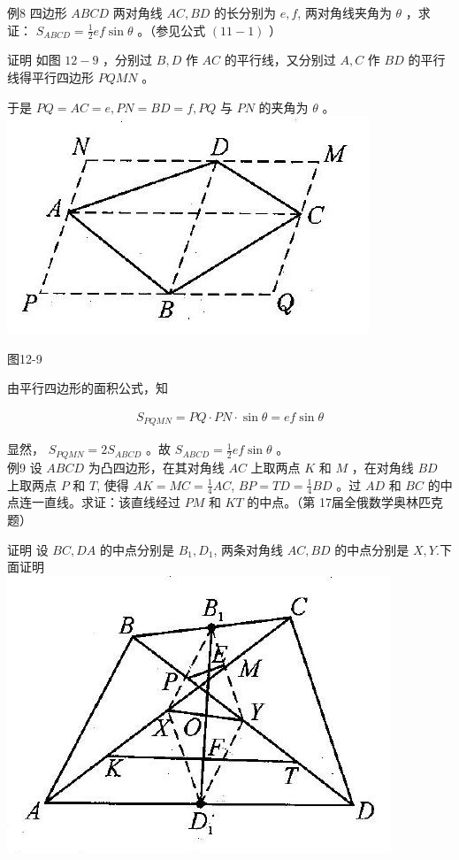 \documentclass[10pt]{article}
\begin{document}
例8 四边形 $A B C D$ 两对角线 $A C, B D$ 的长分别为 $e, f$, 两对角线夹角为 $\theta$ ，求证： $S_{A B C D}=\frac{1}{2} e f \sin \theta$ 。（参见公式 $(11-1)$ ）

证明 如图 $12-9$ ，分别过 $B, D$ 作 $A C$ 的平行线，又分别过 $A, C$ 作 $B D$ 的平行线得平行四边形 $P Q M N$ 。

于是 $P Q=A C=e, P N=B D=f, P Q$ 与 $P N$ 的夹角为 $\theta$ 。\\
\includegraphics[max width=\textwidth, center]{2024_10_30_2c8f45efd4a519b08e1ag-115}

图12-9

由平行四边形的面积公式，知

\begin{align*}
S_{P Q M N}=P Q \cdot P N \cdot \sin \theta=e f \sin \theta
\end{align*}

显然， $S_{P Q M N}=2 S_{A B C D}$ 。故 $S_{A B C D}=\frac{1}{2} e f \sin \theta$ 。\\
例9 设 $A B C D$ 为凸四边形，在其对角线 $A C$ 上取两点 $K$ 和 $M$ ，在对角线 $B D$ 上取两点 $P$ 和 $T$, 使得 $A K=M C=\frac{1}{4} A C$, $B P=T D=\frac{1}{4} B D$ 。过 $A D$ 和 $B C$ 的中点连一直线。求证：该直线经过 $P M$ 和 $K T$ 的中点。（第 17届全俄数学奥林匹克题）

证明 设 $B C, D A$ 的中点分别是 $B_{1}, D_{1}$, 两条对角线 $A C, B D$ 的中点分别是 $X, Y$.下面证明\\
\includegraphics[max width=\textwidth, center]{2024_10_30_2c8f45efd4a519b08e1ag-115(1)}
\end{document}
